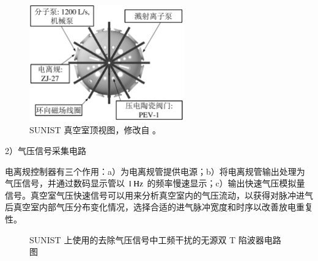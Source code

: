 \begin{figure}
  \centering
  \includegraphics[width=0.6\textwidth]{topview-vacuum-vessel.pdf}
  \caption{SUNIST 真空室顶视图，修改自 。}
  \label{fig:chap04:topview-vacuum-vessel}
\end{figure}


2）气压信号采集电路

电离规控制器有三个作用：a）为电离规管提供电源；b）将电离规管输出处理为气压信号，并通过数码显示管以 $1\,{\rm Hz}$ 的频率慢速显示；c）输出快速气压模拟量信号。真空室气压快速信号可以用来分析真空室内的气压流动，以获得对脉冲进气后真空室内部气压分布变化情况，选择合适的进气脉冲宽度和时序以改善放电重复性。

\begin{figure}%
  \centering
  \caption{SUNIST 上使用的去除气压信号中工频干扰的无源双 T 陷波器电路图}
  \label{fig:chap04:50HzNotchFilter}
\end{figure}

